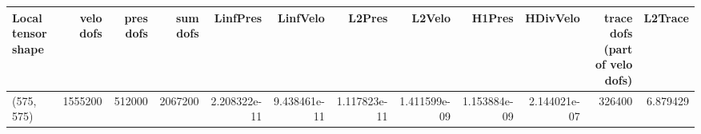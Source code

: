 \begin{tabular}{lrrrrrrrrrrr}
\toprule
Local tensor shape &  velo dofs &  pres dofs &  sum dofs &     LinfPres &     LinfVelo &       L2Pres &       L2Velo &       H1Pres &     HDivVelo &  trace dofs (part of velo dofs) &  L2Trace \\
\midrule
        (575, 575) &    1555200 &     512000 &   2067200 & 2.208322e-11 & 9.438461e-11 & 1.117823e-11 & 1.411599e-09 & 1.153884e-09 & 2.144021e-07 &                          326400 & 6.879429 \\
\bottomrule
\end{tabular}
